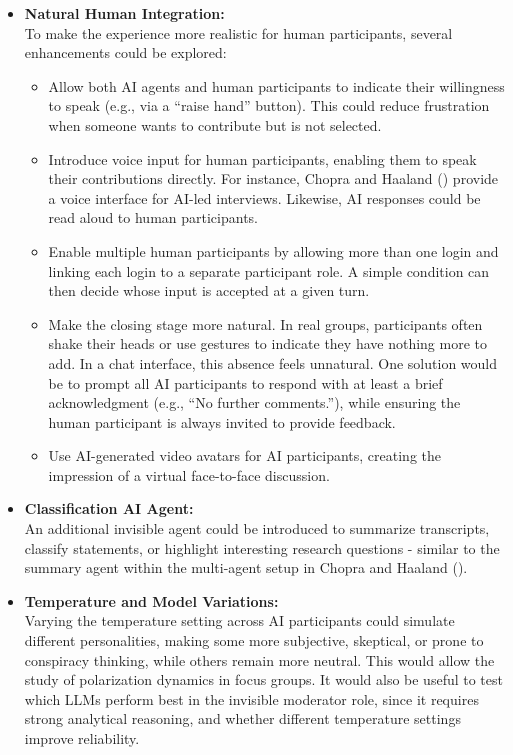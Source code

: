 \documentclass[
  letterpaper,
  DIV=11,
  numbers=noendperiod]{scrartcl}
\providecommand{\tightlist}{%
  \setlength{\itemsep}{0pt}\setlength{\parskip}{0pt}}
\begin{document}
\begin{itemize}
\item
  \textbf{Natural Human Integration:}\\
  To make the experience more realistic for human participants, several
  enhancements could be explored:

  \begin{itemize}
  \tightlist
  \item
    Allow both AI agents and human participants to indicate their
    willingness to speak (e.g., via a ``raise hand'' button). This could
    reduce frustration when someone wants to contribute but is not
    selected.\\
  \item
    Introduce voice input for human participants, enabling them to speak
    their contributions directly. For instance, Chopra and Haaland
    () provide a voice interface
    for AI-led interviews. Likewise, AI responses could be read aloud to
    human participants.\\
  \item
    Enable multiple human participants by allowing more than one login
    and linking each login to a separate participant role. A simple
    condition can then decide whose input is accepted at a given turn.\\
  \item
    Make the closing stage more natural. In real groups, participants
    often shake their heads or use gestures to indicate they have
    nothing more to add. In a chat interface, this absence feels
    unnatural. One solution would be to prompt all AI participants to
    respond with at least a brief acknowledgment (e.g., ``No further
    comments.''), while ensuring the human participant is always invited
    to provide feedback.\\
  \item
    Use AI-generated video avatars for AI participants, creating the
    impression of a virtual face-to-face discussion.
  \end{itemize}
\item
  \textbf{Classification AI Agent:}\\
  An additional invisible agent could be introduced to summarize
  transcripts, classify statements, or highlight interesting research
  questions - similar to the summary agent within the multi-agent setup
  in Chopra and Haaland ().
\item
  \textbf{Temperature and Model Variations:}\\
  Varying the temperature setting across AI participants could simulate
  different personalities, making some more subjective, skeptical, or
  prone to conspiracy thinking, while others remain more neutral. This
  would allow the study of polarization dynamics in focus groups. It
  would also be useful to test which LLMs perform best in the invisible
  moderator role, since it requires strong analytical reasoning, and
  whether different temperature settings improve reliability.
\end{itemize}
\end{document}
